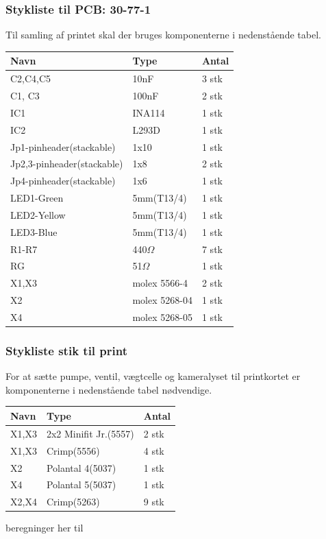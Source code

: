 \subsubsection{Stykliste til PCB: 30-77-1}
Til samling af printet skal der bruges komponenterne i nedenstående tabel. 
\begin{center}
		\begin{longtable}{ | m{6cm} | m{4cm}| m{2cm}| } 
			\hline
			\textbf{Navn} &\textbf{Type} & \textbf{Antal} \\ 
			\hline
			C2,C4,C5 & 10nF & 3 stk \\ 
			\hline
			C1, C3 & 100nF & 2 stk \\ 
			\hline
			IC1 & INA114 & 1 stk \\ 
			\hline
			IC2 & L293D & 1 stk \\ 
			\hline
			Jp1-pinheader(stackable) & 1x10 & 1 stk \\ 
			\hline
			Jp2,3-pinheader(stackable) & 1x8 & 2 stk \\ 
			\hline
			Jp4-pinheader(stackable) & 1x6 & 1 stk \\ 
			\hline
			LED1-Green & 5mm(T13/4) & 1 stk \\ 
			\hline	
			LED2-Yellow & 5mm(T13/4) & 1 stk \\ 
			\hline
			LED3-Blue & 5mm(T13/4) & 1 stk \\ 
			\hline
			R1-R7 & 440$\Omega$ & 7 stk \\ 
			\hline
			RG & 51$\Omega$ & 1 stk \\ 
			\hline
			X1,X3 & molex 5566-4 & 2 stk \\ 
			\hline
			X2 & molex 5268-04 & 1 stk \\ 
			\hline
			X4 & molex 5268-05 & 1 stk \\ 
			\hline
		\end{longtable}
\end{center}

\subsubsection{Stykliste stik til print}
For at sætte pumpe, ventil, vægtcelle og kameralyset til printkortet er komponenterne i nedenstående tabel nødvendige. 
\begin{center}
		\begin{longtable}{ | m{6cm} | m{4cm}| m{2cm}| } 
			\hline
			\textbf{Navn} &\textbf{Type} & \textbf{Antal} \\ 
			\hline
			X1,X3 & 2x2 Minifit Jr.(5557) & 2 stk \\ 
			\hline
			X1,X3 & Crimp(5556) & 4 stk \\ 
			\hline
			X2 & Polantal 4(5037) & 1 stk \\ 
			\hline
			X4 & Polantal 5(5037) & 1 stk \\ 
			\hline
			X2,X4 & Crimp(5263) & 9 stk \\ 
			\hline
		\end{longtable}
\end{center}

beregninger her til
 